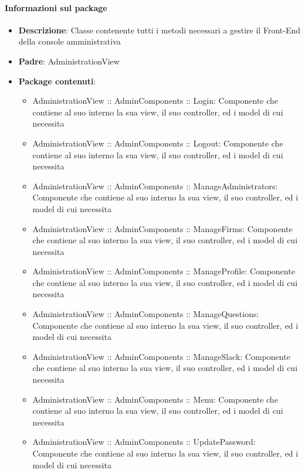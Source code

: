\documentclass[../DefinizioneDiProdotto.tex]{subfiles}
\begin{document}
	\paragraph{Informazioni sul package}\begin{itemize}\item \textbf{Descrizione}: Classe contenente tutti i metodi necessari a gestire il Front-End della console amministrativa\item \textbf{Padre}: AdministrationView\item \textbf{Package contenuti}:
	\begin{itemize}\item AdministrationView :: AdminComponents :: Login: Componente che contiene al suo interno la sua view, il suo controller, ed i model di cui necessita
	\item AdministrationView :: AdminComponents :: Logout: Componente che contiene al suo interno la sua view, il suo controller, ed i model di cui necessita
	\item AdministrationView :: AdminComponents :: ManageAdministrators: Componente che contiene al suo interno la sua view, il suo controller, ed i model di cui necessita
	\item AdministrationView :: AdminComponents :: ManageFirms: Componente che contiene al suo interno la sua view, il suo controller, ed i model di cui necessita
	\item AdministrationView :: AdminComponents :: ManageProfile: Componente che contiene al suo interno la sua view, il suo controller, ed i model di cui necessita
	\item AdministrationView :: AdminComponents :: ManageQuestions: Componente che contiene al suo interno la sua view, il suo controller, ed i model di cui necessita
	\item AdministrationView :: AdminComponents :: ManageSlack: Componente che contiene al suo interno la sua view, il suo controller, ed i model di cui necessita
	\item AdministrationView :: AdminComponents :: Menu: Componente che contiene al suo interno la sua view, il suo controller, ed i model di cui necessita
	\item AdministrationView :: AdminComponents :: UpdatePassword: Componente che contiene al suo interno la sua view, il suo controller, ed i model di cui necessita
	\end{itemize}\end{itemize}
\end{document}
